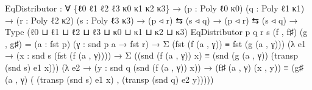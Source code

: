 \documentclass[
  11pt,
  oneside,
  article]{memoir}
\newenvironment{Shaded}{}{}
\newcommand{\NormalTok}[1]{#1}
\newcommand{\OtherTok}[1]{\textcolor[rgb]{0.00,0.44,0.13}{#1}}
\theoremstyle{definition}
\theoremstyle{plain}
\newcommand{\0}{\textsf{0}}
\newcommand{\1}{\tn{\textsf{1}}}
\begin{document}
\begin{Shaded}
\begin{Highlighting}[]
\NormalTok{EqDistributor }\OtherTok{:} \OtherTok{∀} \OtherTok{\{}\NormalTok{ℓ0 ℓ1 ℓ2 ℓ3 κ0 κ1 κ2 κ3}\OtherTok{\}}
                \OtherTok{→} \OtherTok{(}\NormalTok{p }\OtherTok{:}\NormalTok{ Poly ℓ0 κ0}\OtherTok{)} \OtherTok{(}\NormalTok{q }\OtherTok{:}\NormalTok{ Poly ℓ1 κ1}\OtherTok{)}
                \OtherTok{→} \OtherTok{(}\NormalTok{r }\OtherTok{:}\NormalTok{ Poly ℓ2 κ2}\OtherTok{)} \OtherTok{(}\NormalTok{s }\OtherTok{:}\NormalTok{ Poly ℓ3 κ3}\OtherTok{)}
                \OtherTok{→} \OtherTok{(}\NormalTok{p ◃ r}\OtherTok{)}\NormalTok{ ⇆ }\OtherTok{(}\NormalTok{s ◃ q}\OtherTok{)} \OtherTok{→} \OtherTok{(}\NormalTok{p ◃ r}\OtherTok{)}\NormalTok{ ⇆ }\OtherTok{(}\NormalTok{s ◃ q}\OtherTok{)}
                \OtherTok{→}\NormalTok{ Type }\OtherTok{(}\NormalTok{ℓ0 ⊔ ℓ1 ⊔ ℓ2 ⊔ ℓ3 ⊔ κ0 ⊔ κ1 ⊔ κ2 ⊔ κ3}\OtherTok{)}
\NormalTok{EqDistributor p q r s }\OtherTok{(}\NormalTok{f , f♯}\OtherTok{)} \OtherTok{(}\NormalTok{g , g♯}\OtherTok{)} \OtherTok{=} 
    \OtherTok{(}\NormalTok{a }\OtherTok{:}\NormalTok{ fst p}\OtherTok{)} \OtherTok{(}\NormalTok{γ }\OtherTok{:}\NormalTok{ snd p a }\OtherTok{→}\NormalTok{ fst r}\OtherTok{)} 
    \OtherTok{→}\NormalTok{ Σ }\OtherTok{(}\NormalTok{fst }\OtherTok{(}\NormalTok{f }\OtherTok{(}\NormalTok{a , γ}\OtherTok{))}\NormalTok{ ≡ fst }\OtherTok{(}\NormalTok{g }\OtherTok{(}\NormalTok{a , γ}\OtherTok{)))} 
        \OtherTok{(λ}\NormalTok{ e1 }\OtherTok{→} \OtherTok{(}\NormalTok{x }\OtherTok{:}\NormalTok{ snd s }\OtherTok{(}\NormalTok{fst }\OtherTok{(}\NormalTok{f }\OtherTok{(}\NormalTok{a , γ}\OtherTok{))))}
                \OtherTok{→}\NormalTok{ Σ }\OtherTok{((}\NormalTok{snd }\OtherTok{(}\NormalTok{f }\OtherTok{(}\NormalTok{a , γ}\OtherTok{))}\NormalTok{ x}\OtherTok{)} 
\NormalTok{                    ≡ }\OtherTok{(}\NormalTok{snd }\OtherTok{(}\NormalTok{g }\OtherTok{(}\NormalTok{a , γ}\OtherTok{))} 
                           \OtherTok{(}\NormalTok{transp }\OtherTok{(}\NormalTok{snd s}\OtherTok{)}\NormalTok{ e1 x}\OtherTok{)))} 
                    \OtherTok{(λ}\NormalTok{ e2 }\OtherTok{→} \OtherTok{(}\NormalTok{y }\OtherTok{:}\NormalTok{ snd q }\OtherTok{(}\NormalTok{snd }\OtherTok{(}\NormalTok{f }\OtherTok{(}\NormalTok{a , γ}\OtherTok{))}\NormalTok{ x}\OtherTok{))} 
                            \OtherTok{→} \OtherTok{(}\NormalTok{f♯ }\OtherTok{(}\NormalTok{a , γ}\OtherTok{)} \OtherTok{(}\NormalTok{x , y}\OtherTok{))} 
\NormalTok{                              ≡ }\OtherTok{(}\NormalTok{g♯ }\OtherTok{(}\NormalTok{a , γ}\OtherTok{)} 
                                    \OtherTok{(} \OtherTok{(}\NormalTok{transp }\OtherTok{(}\NormalTok{snd s}\OtherTok{)}\NormalTok{ e1 x}\OtherTok{)} 
\NormalTok{                                    , }\OtherTok{(}\NormalTok{transp }\OtherTok{(}\NormalTok{snd q}\OtherTok{)}\NormalTok{ e2 y}\OtherTok{)))))}
\end{Highlighting}
\end{Shaded}
\end{document}
